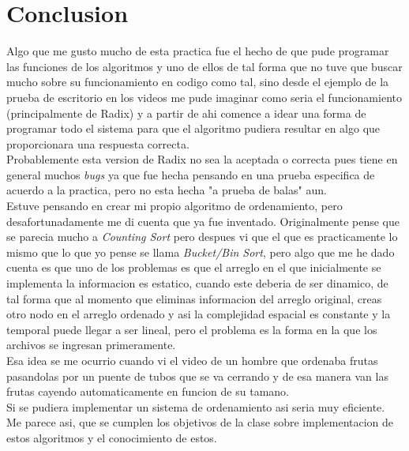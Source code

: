 \documentclass{article}
\begin{document}
		\newpage		
	
	\section{Conclusion}
	
	Algo que me gusto mucho de esta practica fue el hecho de que pude programar las funciones de los algoritmos y uno de ellos de tal forma que no tuve que buscar mucho sobre su funcionamiento en codigo como tal, sino desde el ejemplo de la prueba de escritorio en los videos me pude imaginar como seria el funcionamiento (principalmente de Radix) y a partir de ahi comence a idear una forma de programar todo el sistema para que el algoritmo pudiera resultar en algo que proporcionara una respuesta correcta.\\
	
	Probablemente esta version de Radix no sea la aceptada o correcta pues tiene en general muchos \emph{bugs} ya que fue hecha pensando en una prueba especifica de acuerdo a la practica, pero no esta hecha "a prueba de balas" aun.\\
	
	Estuve pensando en crear mi propio algoritmo de ordenamiento, pero desafortunadamente me di cuenta que ya fue inventado. Originalmente pense que se parecia mucho a \emph{Counting Sort} pero despues vi que el que es practicamente lo mismo que lo que yo pense se llama \emph{Bucket/Bin Sort}, pero algo que me he dado cuenta es que uno de los problemas es que el arreglo en el que inicialmente se implementa la informacion es estatico, cuando este deberia de ser dinamico, de tal forma que al momento que eliminas informacion del arreglo original, creas otro nodo en el arreglo ordenado y asi la complejidad espacial es constante y la temporal puede llegar a ser lineal, pero el problema es la forma en la que los archivos se ingresan primeramente.\\
	
	Esa idea se me ocurrio cuando vi el video de un hombre que ordenaba frutas pasandolas por un puente de tubos que se va cerrando y de esa manera van las frutas cayendo automaticamente en funcion de su tamano.\\
	
	Si se pudiera implementar un sistema de ordenamiento asi seria muy eficiente.\\
	
	Me parece asi, que se cumplen los objetivos de la clase sobre implementacion de estos algoritmos y el conocimiento de estos.\\
	
\end{document}
